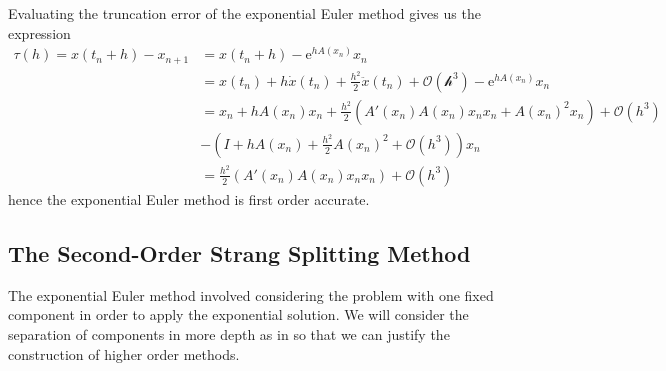 Evaluating the truncation error of the exponential Euler method gives us the expression
\begin{equation*}
    \begin{aligned}
        \tau(h) = x(t_n + h) - x_{n+1} &= x(t_n + h) - \mathrm{e}^{h A(x_n)}x_n \\
        &= x(t_n) + h \dot{x}(t_n) + \frac{h^2}{2}\ddot{x}(t_n) + \mathcal{O(h^3)} - \mathrm{e}^{h A(x_n)}x_n \\
        &= x_n + h A(x_n)x_n + \frac{h^2}{2}\left( A'(x_n)A(x_n)x_n x_n + A(x_n)^2 x_n \right) + \mathcal{O}(h^3)\\
         &- \left( I + h A(x_n) + \frac{h^2}{2}A(x_n)^2 + \mathcal{O}(h^3) \right)x_n \\
        &= \frac{h^2}{2} \left( A'(x_n) A(x_n) x_n x_n \right) + \mathcal{O}(h^3)
    \end{aligned}
\end{equation*}
hence the exponential Euler method is first order accurate.

\subsection{The Second-Order Strang Splitting Method}

The exponential Euler method involved considering the problem with one fixed component in order to apply the exponential solution.
We will consider the separation of components in more depth as in \cite{blanes_pos_2022} so that we can justify the construction of higher order methods.

